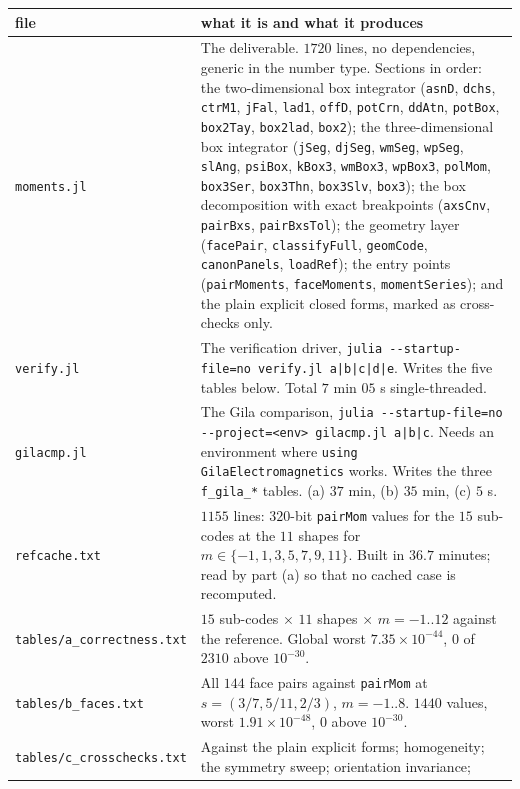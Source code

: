 \documentclass[11pt]{article}
\theoremstyle{remark}
\newcommand{\code}[1]{\texttt{#1}}
\begin{document}
\begin{center}\small
\begin{tabular}{@{}lp{}@{}}
\toprule
file & what it is and what it produces\\
\midrule
\code{moments.jl} &
The deliverable. $1720$ lines, no dependencies, generic in the number type. Sections in
order: the two-dimensional box integrator (\code{asnD}, \code{dchs}, \code{ctrM1},
\code{jFal}, \code{lad1}, \code{offD}, \code{potCrn}, \code{ddAtn}, \code{potBox},
\code{box2Tay}, \code{box2lad}, \code{box2}); the three-dimensional box integrator
(\code{jSeg}, \code{djSeg}, \code{wmSeg}, \code{wpSeg}, \code{slAng}, \code{psiBox},
\code{kBox3}, \code{wmBox3}, \code{wpBox3}, \code{polMom}, \code{box3Ser}, \code{box3Thn},
\code{box3Slv}, \code{box3}); the box decomposition with exact breakpoints (\code{axsCnv},
\code{pairBxs}, \code{pairBxsTol}); the geometry layer (\code{facePair},
\code{classifyFull}, \code{geomCode}, \code{canonPanels}, \code{loadRef}); the entry points
(\code{pairMoments}, \code{faceMoments}, \code{momentSeries}); and the plain explicit
closed forms, marked as cross-checks only.\\
\addlinespace
\code{verify.jl} &
The verification driver, \code{julia -{}-startup-file=no verify.jl a|b|c|d|e}. Writes the
five tables below. Total $7$ min $05$ s single-threaded.\\
\addlinespace
\code{gilacmp.jl} &
The Gila comparison, \code{julia -{}-startup-file=no -{}-project=<env> gilacmp.jl a|b|c}.
Needs an environment where \code{using GilaElectromagnetics} works. Writes the three
\code{f\_gila\_*} tables. (a) $37$ min, (b) $35$ min, (c) $5$ s.\\
\addlinespace
\code{refcache.txt} &
$1155$ lines: $320$-bit \code{pairMom} values for the $15$ sub-codes at the $11$ shapes for
$m \in \{-1,1,3,5,7,9,11\}$. Built in $36.7$ minutes; read by part (a) so that no cached
case is recomputed.\\
\addlinespace
\code{tables/a\_correctness.txt} &
$15$ sub-codes $\times$ $11$ shapes $\times$ $m = -1..12$ against the reference. Global
worst $7.35\times10^{-44}$, $0$ of $2310$ above $10^{-30}$.\\
\code{tables/b\_faces.txt} &
All $144$ face pairs against \code{pairMom} at $s = (3/7,5/11,2/3)$, $m = -1..8$. $1440$
values, worst $1.91\times10^{-48}$, $0$ above $10^{-30}$.\\
\code{tables/c\_crosschecks.txt} &
Against the plain explicit forms; homogeneity; the symmetry sweep; orientation invariance;

\end{tabular}
\end{center}
\end{document}
